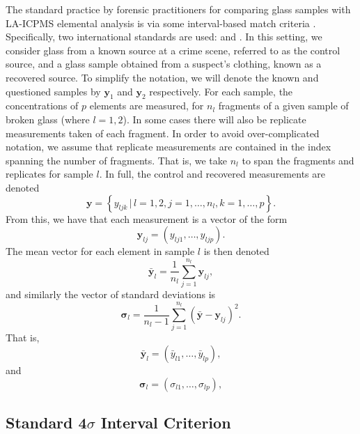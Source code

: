 \documentclass[a4paper]{article}
\newcommand{\bs}[1]{\boldsymbol{#1}}
\newcommand{\y}{\boldsymbol{y}}
\begin{document}
The standard practice by forensic practitioners for comparing glass samples with LA-ICPMS elemental analysis is via some interval-based match criteria \citep{Park2019}. Specifically, two international standards are used: \citet{ASTM12} and \citet{ASTM16}. In this setting, we consider glass from a known source at a crime scene, referred to as the control source, and a glass sample obtained from a suspect's clothing, known as a recovered source. To simplify the notation, we will denote the known and questioned samples by $\bs{y}_1$ and $\bs{y}_2$ respectively. For each sample, the concentrations of $p$ elements are measured, for $n_l$ fragments of a given sample of broken glass (where $l=1,2$). In some cases there will also be replicate measurements taken of each fragment. In order to avoid over-complicated notation, we assume that replicate measurements are contained in the index spanning the number of fragments. That is, we take $n_l$ to span the fragments and replicates for sample $l$. In full, the control and recovered measurements are denoted 
$$
\bs{y} = \left\{y_{ljk} \, | \, l = 1,2, j = 1,\dots,n_l, k = 1,\dots,p \right\}.
$$
From this, we have that each measurement is a vector of the form
\begin{equation*}
	\bs{y}_{lj} = (y_{lj1}, \dots, y_{ljp}).
\end{equation*}
The mean vector for each element in sample $l$ is then denoted
\begin{equation*}
    \bar{\bs{y}}_l = \frac{1}{n_l} \sum_{j=1}^{n_l} \bs{y}_{lj},
\end{equation*}
and similarly the vector of standard deviations is
\begin{equation*}
    \bs{\sigma}_l = \frac{1}{n_l-1} \sum_{j=1}^{n_l} (\bar{\y} - \bs{y}_{lj})^2.
\end{equation*}
That is,
\begin{equation*}
	\bar{\bs{y}}_l = (\bar{y}_{l1}, \dots, \bar{y}_{lp}),
\end{equation*}
and
\begin{equation*}
	\bs{\sigma}_l = (\sigma_{l1}, \dots, \sigma_{lp}),
\end{equation*}

\subsection{Standard 4$\sigma$ Interval Criterion}

\end{document}
